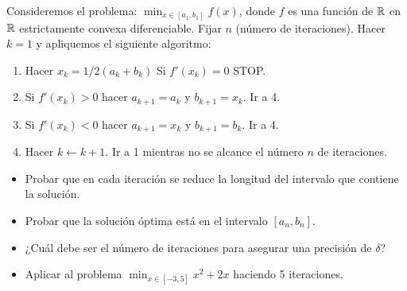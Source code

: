 \documentclass[twoside]{article}
\begin{document}
\begin{ejercicio}{2}
Consideremos el problema: $\min_{x\in[a_1,b_1]}f(x)$, donde $f$ es una función de $\mathbb{R}$ en $\mathbb{R}$ estrictamente convexa diferenciable. Fijar $n$ (número de iteraciones). Hacer $k=1$ y apliquemos el siguiente algoritmo:
\begin{enumerate}
\item Hacer $x_k=1/2(a_k+b_k)$ Si $f'(x_k)=0$ STOP.
\item Si $f'(x_k)>0$ hacer $a_{k+1}=a_k$ y $b_{k+1}=x_k$. Ir a 4.
\item Si $f'(x_k)<0$ hacer $a_{k+1}=x_k$ y $b_{k+1}=b_k$. Ir a 4. 
\item Hacer $k\leftarrow k+1$. Ir a 1 mientras no se alcance el número $n$ de iteraciones.
\end{enumerate}
\begin{itemize}
\item Probar que en cada iteración se reduce la longitud del intervalo que contiene la solución.
\item Probar que la solución óptima está en el intervalo $[a_n,b_n]$. 
\item ¿Cuál debe ser el número de iteraciones para asegurar una precisión de $\delta$?
\item Aplicar al problema $\min_{x\in[-3,5]}x^2+2x$ haciendo 5 iteraciones.
\end{itemize}
\end{ejercicio}
\end{document}
